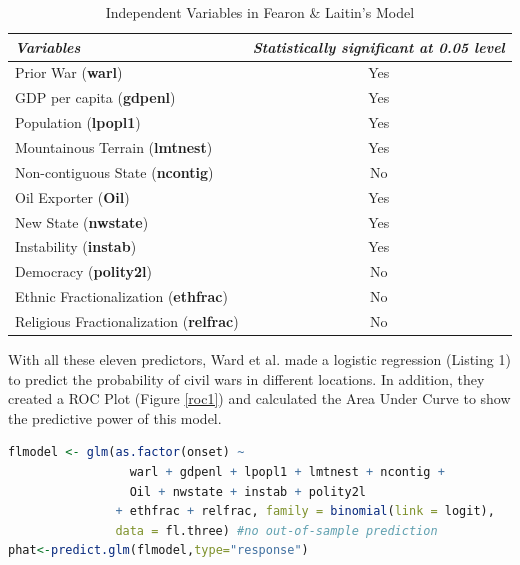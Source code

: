 \documentclass{article}
\begin{document}
\begin{table}[h!]
\centering
\caption{Independent Variables in Fearon \& Laitin's Model}
\label{variable}
\begin{tabular}{lc}
\hline
\textit{Variables}                    & \textit{Statistically significant at 0.05 level} \\ \hline
Prior War (\textbf{warl})                      & Yes                                              \\
GDP per capita (\textbf{gdpenl})               & Yes                                              \\
Population (\textbf{lpopl1})                   & Yes                                              \\
Mountainous Terrain (\textbf{lmtnest})         & Yes                                              \\
Non-contiguous State (\textbf{ncontig})        & No                                               \\
Oil Exporter (\textbf{Oil})                    & Yes                                              \\
New State (\textbf{nwstate})                   & Yes                                              \\
Instability (\textbf{instab})                  & Yes                                              \\
Democracy (\textbf{polity2l})                  & No                                               \\
Ethnic Fractionalization (\textbf{ethfrac})    & No                                               \\
Religious Fractionalization (\textbf{relfrac}) & No                                              
\end{tabular}
\end{table}

With all these eleven predictors, Ward et al. made a logistic regression (Listing 1) to predict the probability of civil wars in different locations. In addition, they created a ROC Plot (Figure \ref{roc1}) and calculated the Area Under Curve to show the predictive power of this model. 



\begin{lstlisting}[language=R, caption=FL Original Model - Logistic Regression]
flmodel <- glm(as.factor(onset) ~ 
                 warl + gdpenl + lpopl1 + lmtnest + ncontig + 
                 Oil + nwstate + instab + polity2l
               + ethfrac + relfrac, family = binomial(link = logit),
               data = fl.three) #no out-of-sample prediction
phat<-predict.glm(flmodel,type="response")
\end{lstlisting}
\end{document}
